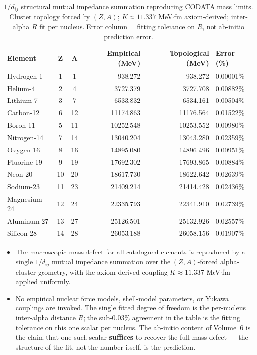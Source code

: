 \begin{table}[htbp]
    \centering
    \begin{tabularx}{\textwidth}{@{}l c c r r X@{}}
    \hline\hline
    \textbf{Element} & \textbf{Z} & \textbf{A} & \textbf{Empirical (MeV)} & \textbf{Topological (MeV)} & \textbf{Error (\%)} \\
    \hline
    Hydrogen-1 & 1 & 1 & 938.272 & 938.272 & 0.00001\% \\
    Helium-4 & 2 & 4 & 3727.379 & 3727.708 & 0.00882\% \\
    Lithium-7 & 3 & 7 & 6533.832 & 6534.161 & 0.00504\% \\
    Carbon-12 & 6 & 12 & 11174.863 & 11176.564 & 0.01522\% \\
    Boron-11 & 5 & 11 & 10252.548 & 10253.552 & 0.00980\% \\
    Nitrogen-14 & 7 & 14 & 13040.204 & 13043.280 & 0.02359\% \\
    Oxygen-16 & 8 & 16 & 14895.080 & 14896.496 & 0.00951\% \\
    Fluorine-19 & 9 & 19 & 17692.302 & 17693.865 & 0.00884\% \\
    Neon-20 & 10 & 20 & 18617.730 & 18622.642 & 0.02639\% \\
    Sodium-23 & 11 & 23 & 21409.214 & 21414.428 & 0.02436\% \\
    Magnesium-24 & 12 & 24 & 22335.793 & 22341.910 & 0.02739\% \\
    Aluminum-27 & 13 & 27 & 25126.501 & 25132.926 & 0.02557\% \\
    Silicon-28 & 14 & 28 & 26053.188 & 26058.156 & 0.01907\% \\
    \hline\hline
    \end{tabularx}
    \caption{$1/d_{ij}$ structural mutual impedance summation reproducing CODATA mass limits. Cluster topology forced by $(Z,A)$; $K \approx 11.337$ MeV$\cdot$fm axiom-derived; inter-alpha $R$ fit per nucleus. Error column = fitting tolerance on $R$, not ab-initio prediction error.}
    \label{tab:mass_summary}
\end{table}

\begin{summarybox}
\begin{itemize}
    \item The macroscopic mass defect for all catalogued elements is reproduced by a single $1/d_{ij}$ mutual impedance summation over the $(Z,A)$-forced alpha-cluster geometry, with the axiom-derived coupling $K \approx 11.337$ MeV$\cdot$fm applied uniformly.
    \item No empirical nuclear force models, shell-model parameters, or Yukawa couplings are invoked. The single fitted degree of freedom is the per-nucleus inter-alpha distance $R$; the sub-$0.03\%$ agreement in the table is the fitting tolerance on this one scalar per nucleus. The ab-initio content of Volume~6 is the claim that one such scalar \textbf{suffices} to recover the full mass defect — the structure of the fit, not the number itself, is the prediction.
\end{itemize}
\end{summarybox}

